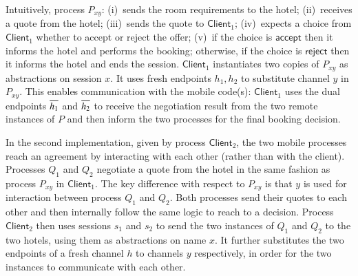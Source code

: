 \documentclass[preprint,11pt]{elsarticle}
\newcommand{\accept}{\mathsf{accept}}
\newcommand{\reject}{\mathsf{reject}}
\newcommand{\Client}{\mathsf{Client}}
\begin{document}
{		Intuitively, process $P_{xy}$:
		(i)~sends the room requirements to the hotel;
		(ii)~receives a quote from the hotel;
		(iii)~sends the quote to  $\Client_1$;
		(iv)~expects a choice from   $\Client_1$ whether to accept or reject the offer;
		(v)~if the choice is $\accept$ then it informs the hotel and performs the booking;
		otherwise, if the choice is $\reject$ then it informs the hotel and ends the session.
				$\Client_1$ instantiates two copies of  $P_{xy}$ as abstractions
		on session $x$. It uses 
		fresh endpoints $h_1, h_2$ to substitute channel $y$
		in $P_{xy}$. This enables communication with the mobile code(s): 
		$\Client_1$ uses the dual endpoints $\overline{h_1}$ and $\overline{h_2}$
		to receive the negotiation
		result from the two remote instances of $P$ and then inform the two
		processes for the final booking decision.

In the second implementation, given by process $\Client_2$,  
the two mobile processes reach an agreement
by interacting with each other (rather than with the client).
Processes $Q_1$ and $Q_2$  negotiate a quote from the
		hotel in the same fashion as process $P_{xy}$ in $\Client_1$.
		The key difference with respect to $P_{xy}$ is that $y$ is used for
		interaction between process $Q_1$ and $Q_2$. Both processes send
		their quotes to each other and then internally follow the same
		logic to reach to a decision.
		Process  $\Client_2$ then uses sessions $s_1$ and $s_2$ to send the two
		instances of $Q_1$ and $Q_2$ to the two hotels, using them 
	 as abstractions
		on name $x$. It further substitutes
		the two endpoints of a fresh channel $h$ to channels $y$ respectively,
		in order for the two instances to communicate with each other.



%
%

}
\end{document}
